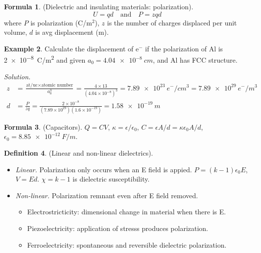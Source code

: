\documentclass{article}
\theoremstyle{definition}
\newtheorem{definition}{Definition}[section]
\newtheorem{formula}[definition]{Formula}
\newtheorem{example}[definition]{Example}
\begin{document}
\begin{formula}
    (Dielectric and insulating materials: polarization).
    \begin{equation*}
        U = qd \quad \text{and} \quad P = zqd
    \end{equation*}
    where $P$ is polarization (C/m$^2$), $z$ is the number of charges displaced per unit volume, $d$ is avg displacement (m).
\end{formula}

\begin{example}
    Calculate the displacement of e$^-$ if the polarization of Al is \SI{2e-8}{C/m^2} and given $a_0 = \SI{4.04e-8}{cm}$, and Al has FCC structure.
    
    \textit{Solution.}
    \begin{align*}
        z &= \frac{\text{at/uc} \times \text{atomic number}}{a_0^3} = \frac{4 \times 13}{(4.04 \times 10^{-8})^3} = \SI{7.89e23}{e^-/cm^3} = \SI{7.89e29}{e^-/m^3} \\
        d &= \frac{P}{zq} = \frac{2 \times 10^{-8}}{(7.89 \times 10^{29})(1.6 \times 10^{-19})} = \SI{1.58e-19}{m}
    \end{align*}
\end{example}

\begin{formula}
    (Capacitors). $Q = CV$, $\kappa = \epsilon/\epsilon_0$, $C = \epsilon A/d = \kappa \epsilon_0 A/d$, $\epsilon_0 = \SI{8.85e-12}{F/m}$.
\end{formula}

\begin{definition}
    (Linear and non-linear dielectrics).
    \begin{itemize}
        \item \textit{Linear.} Polarization only occurs when an E field is appied. $P = (k-1) \epsilon_0 E$, $V = Ed$. $\chi = k-1$ is dielectric susceptibility.
        \item \textit{Non-linear.} Polarization remnant even after E field removed.
        \begin{itemize}
            \item Electrostricticity: dimensional change in material when there is E.
            \item Piezoelectricity: application of stresss produces polarization.
            \item Ferroelectricity: spontaneous and reversible dielectric polarization.
        \end{itemize}
    \end{itemize}
\end{definition}
\end{document}
